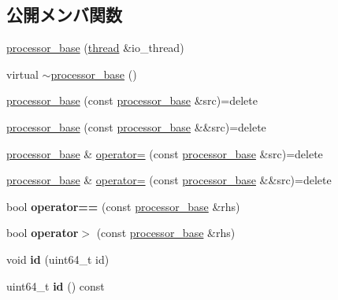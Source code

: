\subsection*{公開メンバ関数}
\begin{DoxyCompactItemize}
\item 
\hyperlink{classprocessor__base_a0fb3660589090640decbaef29e66a100}{processor\+\_\+base} (\hyperlink{classthread}{thread} \&io\+\_\+thread)
\item 
virtual \hyperlink{classprocessor__base_a158d2b8a7cbfaff3b56de60c9ca00de2}{$\sim$processor\+\_\+base} ()
\item 
\hyperlink{classprocessor__base_aef9b4dfa6c564ad86d5b28210772be33}{processor\+\_\+base} (const \hyperlink{classprocessor__base}{processor\+\_\+base} \&src)=delete
\item 
\hyperlink{classprocessor__base_a5d8c9251cdf1e4d522f16a0b605c7d6a}{processor\+\_\+base} (const \hyperlink{classprocessor__base}{processor\+\_\+base} \&\&src)=delete
\item 
\hyperlink{classprocessor__base}{processor\+\_\+base} \& \hyperlink{classprocessor__base_a52553966ab699b15a1eb70a96211baac}{operator=} (const \hyperlink{classprocessor__base}{processor\+\_\+base} \&src)=delete
\item 
\hyperlink{classprocessor__base}{processor\+\_\+base} \& \hyperlink{classprocessor__base_a345a5ebd2dc94130c9a08f49fd82cb8d}{operator=} (const \hyperlink{classprocessor__base}{processor\+\_\+base} \&\&src)=delete
\item 
\hypertarget{classprocessor__base_acb2a834439a018314170c0d851869ce1}{}\label{classprocessor__base_acb2a834439a018314170c0d851869ce1} 
bool {\bfseries operator==} (const \hyperlink{classprocessor__base}{processor\+\_\+base} \&rhs)
\item 
\hypertarget{classprocessor__base_aacf4bb3a3a65821048dd6afa195fc99e}{}\label{classprocessor__base_aacf4bb3a3a65821048dd6afa195fc99e} 
bool {\bfseries operator$>$} (const \hyperlink{classprocessor__base}{processor\+\_\+base} \&rhs)
\item 
\hypertarget{classprocessor__base_a52adfd77275b92eac46e21c15b339089}{}\label{classprocessor__base_a52adfd77275b92eac46e21c15b339089} 
void {\bfseries id} (uint64\+\_\+t id)
\item 
\hypertarget{classprocessor__base_ae24f08a5885789e1ae198541ecb8cd04}{}\label{classprocessor__base_ae24f08a5885789e1ae198541ecb8cd04} 
uint64\+\_\+t {\bfseries id} () const
\item 
\hypertarget{classprocessor__base_af3afa79b3619e41af6b78c4eecdbbd79}{}\label{classprocessor__base_af3afa79b3619e41af6b78c4eecdbbd79} 

\end{DoxyCompactItemize}

